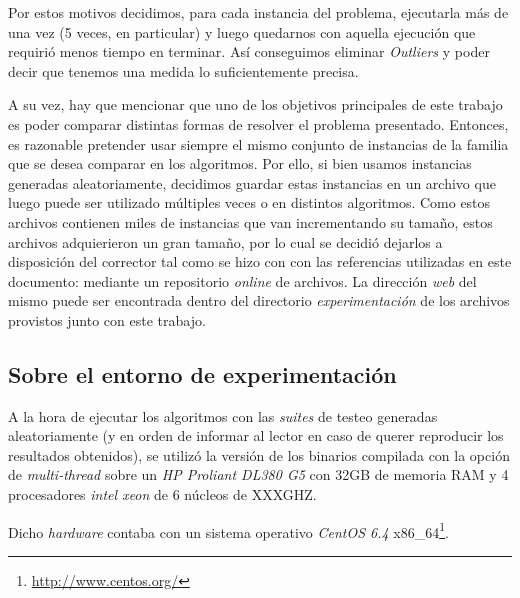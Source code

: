 \par Por estos motivos decidimos, para cada instancia del problema, ejecutarla
    m\'as de una vez (5 veces, en particular) y luego quedarnos con aquella
    ejecuci\'on que requiri\'o menos tiempo en terminar. As\'i
    conseguimos eliminar \emph{Outliers} y poder decir que tenemos una medida
    lo suficientemente precisa.

\par A su vez, hay que mencionar que uno de los objetivos principales de este
    trabajo es poder comparar distintas formas de resolver el problema
    presentado. Entonces, es razonable pretender usar siempre el mismo conjunto
    de instancias de la familia que se desea comparar en los algoritmos. Por
    ello, si bien usamos instancias generadas aleatoriamente, decidimos guardar
    estas instancias en un archivo que luego puede ser utilizado m\'ultiples
    veces o en distintos algoritmos. Como estos archivos contienen miles de
    instancias que van incrementando su tama\~no, estos archivos adquierieron
    un gran tama\~no, por lo cual se decidi\'o dejarlos a disposici\'on del
    corrector tal como se hizo con con las referencias utilizadas en este
    documento: mediante un repositorio \emph{online} de archivos. La direcci\'on
    \emph{web} del mismo puede ser encontrada dentro del directorio \emph{%
    experimentaci\'on} de los archivos provistos junto con este trabajo.

{}
\subsection*{Sobre el entorno de experimentaci\'on}
\par A la hora de ejecutar los algoritmos con las \emph{suites} de testeo
    generadas aleatoriamente (y en orden de informar al lector en caso
    de querer reproducir los resultados obtenidos), se utiliz\'o la versi\'on
    de los binarios compilada con la opci\'on de \emph{multi-thread} sobre
    un \emph{HP Proliant DL380 G5} con 32GB de memoria RAM y 4 procesadores
    \emph{intel xeon} de 6 n\'ucleos de XXXGHZ.

\par Dicho \emph{hardware} contaba con un sistema operativo \emph{CentOS 6.4}
    x86\_64\footnote{\url{http://www.centos.org/}}.
